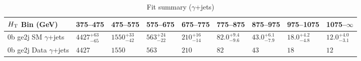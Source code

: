 \documentclass[8pt]{article}
\def\scalht{\mbox{$H_{\rm{T}}$}\xspace}
\newcommand\T{\rule{0pt}{2.6ex}}
\begin{document}
\begin{table}[ht!]
\caption{Fit summary ($\gamma$+jets)}
\label{tab:ensemble-summary}
\centering
\begin{tabular}{ lllllllll }

\hline
\scalht Bin (GeV)       & 375--475                       & 475--575                       & 575--675                       & 675--775                       & 775--875                       & 875--975                       & 975--1075                      & 1075--$\infty$                 \\ [1.000000ex]
\hline
0b ge2j SM $\gamma$+jets\T & $4427^{+63}_{-65}$             & $1550^{+33}_{-42}$             & $563^{+24}_{-22}$              & $210^{+16}_{-14}$              & $82.0^{+9.4}_{-9.6}$           & $43.0^{+6.1}_{-7.9}$           & $18.0^{+4.2}_{-4.8}$           & $12.0^{+4.0}_{-3.1}$           \\ 
0b ge2j Data $\gamma$+jets\T & $4427$                         & $1550$                         & $563$                          & $210$                          & $82$                           & $43$                           & $18$                           & $12$                           \\ 
\hline

\end{tabular}
\end{table}
\end{document}

